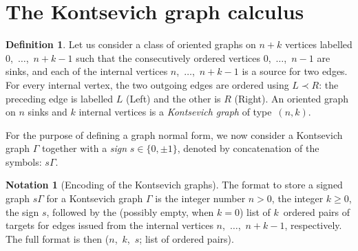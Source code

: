 \documentclass[a4paper]{jpconf}%
\theoremstyle{definition}
\newtheorem{define}{Definition}%
\newtheorem*{notation}{Notation}
\theoremstyle{remark}
\begin{document}



\section{The Kontsevich graph calculus}\label{SecGraphs}

\begin{define}%
\label{DefKgraph}
Let us consider a class of oriented graphs on $n+k$ vertices labelled $0$,\ $\ldots$,\ $n+k-1$ such that the consecutively ordered vertices $0$,\ $\ldots$,\ $n-1$ are sinks, and each of the internal vertices $n$,\ $\ldots$,\ $n+k-1$ is a source for two edges. %
For every internal vertex, the two outgoing edges are ordered using $L \prec R$: the preceding edge is labelled $L$ (Left) and the other is $R$ (Right).
An oriented graph on $n$ sinks and $k$ internal vertices %
is a \emph{Kontsevich graph} of type~$(n,k)$.
\end{define}

For the purpose of defining a graph normal form, we now consider a Kontsevich graph $\Gamma$ together with a {\em sign} $s \in \{0, \pm 1\}$, denoted by concatenation of the symbols: $s\Gamma$.

\begin{notation}[Encoding of the Kontsevich graphs]\label{DefEncodingKgraph}
The format to store a signed graph $s\Gamma$ for a Kontsevich graph $\Gamma$ is the integer number $n>0$, the integer $k \geqslant 0$, the sign $s$, followed by the (possibly empty, when $k=0$) list of $k$~ordered pairs of targets for edges issued from the internal vertices $n$,\ $\ldots$,\ $n+k-1$, respectively.
The full format is then ($n$,\ $k$,\ $s$; list of ordered pairs).
\end{notation}
\end{document}
